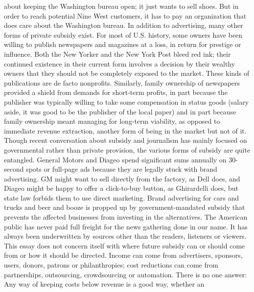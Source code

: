 about keeping the Washington bureau open; it just wants to sell shoes. But in
order to reach potential Nine West customers, it has to pay an organization that
does care about the Washington bureau.
In addition to advertising, many other forms of private subsidy exist. For most
of U.S. history, some owners have been willing to publish newspapers and magazines
at a loss, in return for prestige or influence. Both the New Yorker and the
New York Post bleed red ink; their continued existence in their current form
involves a decision by their wealthy owners that they should not be completely
exposed to the market. These kinds of publications are de facto nonprofits.
Similarly, family ownership of newspapers provided a shield from demands for
short-term profits, in part because the publisher was typically willing to take
some compensation in status goods (salary aside, it was good to be the publisher
of the local paper) and in part because family ownership meant managing for
long-term viability, as opposed to immediate revenue extraction, another form
of being in the market but not of it.
Though recent conversation about subsidy and journalism has mainly focused
on governmental rather than private provision, the various forms of subsidy are
quite entangled. General Motors and Diageo spend significant sums annually on
30-second spots or full-page ads because they are legally stuck with brand advertising.
GM might want to sell directly from the factory, as Dell does, and Diageo
might be happy to offer a click-to-buy button, as Ghirardelli does, but state law
forbids them to use direct marketing. Brand advertising for cars and trucks and
beer and booze is propped up by government-mandated subsidy that prevents
the affected businesses from investing in the alternatives.
The American public has never paid full freight for the news gathering done in
our name. It has always been underwritten by sources other than the readers,
listeners or viewers. This essay does not concern itself with where future subsidy
can or should come from or how it should be directed. Income can come from
advertisers, sponsors, users, donors, patrons or philanthropies; cost reductions can
come from partnerships, outsourcing, crowdsourcing or automation. There is no
one answer: Any way of keeping costs below revenue is a good way, whether an

